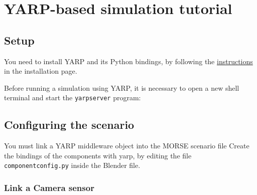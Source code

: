 \documentclass[twoside,a4paper,10pt]{report}
\newcommand{\dokutitlelevelone}[1]{\chapter{#1}}
\newcommand{\dokutitleleveltwo}[1]{\section{#1}}
\newcommand{\dokutitleleveltree}[1]{\subsection{#1}}
\newcommand{\dokumonospace}[1]{\texttt{#1}}
\begin{document}
\dokutitlelevelone{YARP-based simulation tutorial}
\label{46a8ae159056a35cad5aad3f96f08029}%
\label{1dd029a60f7f3dd1deaf993ce4538edf}%

\dokutitleleveltwo{Setup}
\label{a0f848942ce863cf53c0fa6cc684007d}%

You need to install YARP and its Python bindings, by following the \hyperref[ec46d0b85077d7a7fe8da2e2b4c70462]{ instructions} in the installation page.

Before running a simulation using YARP, it is necessary to open a new shell terminal and start the \dokumonospace{yarpserver} program:


\small
{}
\normalsize

\dokutitleleveltwo{Configuring the scenario}
\label{a5eb0127854ee2548f6841c01cbaee73}%

You must link a YARP middleware object into the MORSE scenario file
Create the bindings of the components with yarp, by editing the file \dokumonospace{component{\textunderscore}config.py} inside the Blender file.


\dokutitleleveltree{Link a Camera sensor}
\label{2e2e4de5af03ad71dd248a06e314e9d7}%
\end{document}
